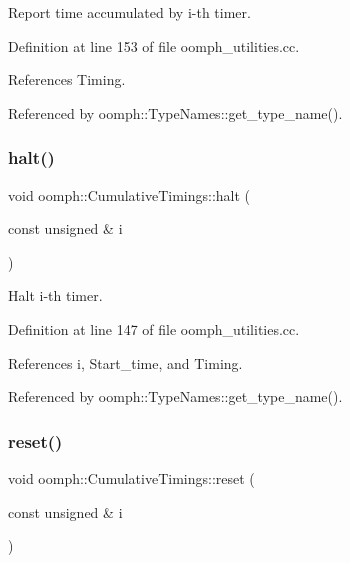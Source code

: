 Report time accumulated by i-\/th timer. 



Definition at line 153 of file oomph\+\_\+utilities.\+cc.



References Timing.



Referenced by oomph\+::\+Type\+Names\+::get\+\_\+type\+\_\+name().

\mbox{\label{namespaceoomph_1_1CumulativeTimings_ab64f3634df4fbe6790069dcc06fdc0bc}} 
\subsubsection{\texorpdfstring{halt()}{halt()}}
{\footnotesize\ttfamily void oomph\+::\+Cumulative\+Timings\+::halt (\begin{DoxyParamCaption}\item[{const unsigned \&}]{i }\end{DoxyParamCaption})}



Halt i-\/th timer. 



Definition at line 147 of file oomph\+\_\+utilities.\+cc.



References i, Start\+\_\+time, and Timing.



Referenced by oomph\+::\+Type\+Names\+::get\+\_\+type\+\_\+name().

\mbox{\label{namespaceoomph_1_1CumulativeTimings_a843f5485fc01485965e5547f61ac069f}} 
\subsubsection{\texorpdfstring{reset()}{reset()}\hspace{0.1cm}{\footnotesize\ttfamily [1/2]}}
{\footnotesize\ttfamily void oomph\+::\+Cumulative\+Timings\+::reset (\begin{DoxyParamCaption}\item[{const unsigned \&}]{i }\end{DoxyParamCaption})}



